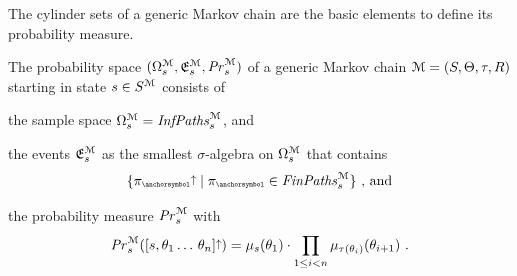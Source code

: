 The cylinder sets of a generic Markov chain are the basic elements to define its probability measure.
\begin{definition}
\label{def:probspace_mc}
The probability space $(\Omega_{s}^{\mathcal{M}},\mathfrak{E}_{s}^{\mathcal{M}},\mathit{Pr}_{s}^{\mathcal{M}})$ of a generic Markov chain $\mathcal{M}=(S, \Theta, \tau, R)$ starting in state $s\in S^{\mathcal{M}}$ consists of
\begin{compactitem}
\item the sample space $\Omega_{s}^{\mathcal{M}} = \mathit{InfPaths}_{s}^{\mathcal{M}}$, and 
\item the events $\mathfrak{E}_{s}^{\mathcal{M}}$ as the smallest $\sigma$-algebra on $\Omega_{s}^{\mathcal{M}}$ that contains
        \begin{equation*}
         \{ \Cylinder{\ancfinpath}\mid \ancfinpath \in \McAncFinPathsStartingFrom{\state} \}
         \ \text{, and}
      \end{equation*}
\item the probability measure $\mathit{Pr}_{s}^{\mathcal{M}}$ with
		\begin{equation*}%
  			\McProbInState{\state}(\Cylinder{\anctuple{\state}{\target_1\dotspath\,\target_n}}) =
  			\distOfState{\state}(\target_1) \cdot \prod_{\natrangeex{i}{1}{n}} \distOfState{\targetstate(\target_i)}(\target_{i+1}) \ \text{.}
		\end{equation*}
\end{compactitem}
\end{definition}

